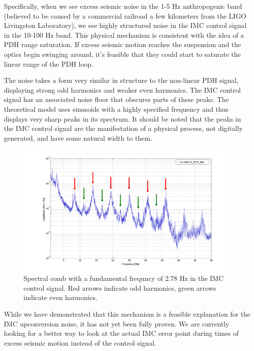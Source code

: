 Specifically, when we see excess seismic noise in the 1-5 Hz anthropogenic band (believed to be caused by a commercial railroad a few kilometers from the LIGO Livingston Laboratory), we see highly structured noise in the IMC control signal in the 10-100 Hz band. This physical mechanism is consistent with the idea of a PDH range saturation. If excess seismic motion reaches the suspension and the optics begin swinging around, it's feasible that they could start to saturate the linear range of the PDH loop.

The noise takes a form very similar in structure to the non-linear PDH signal, displaying strong odd harmonics and weaker even harmonics. The IMC control signal has an associated noise floor that obscures parts of these peaks. The theoretical model uses sinusoids with a highly specified frequency and thus displays very sharp peaks in its spectrum. It should be noted that the peaks in the IMC control signal are the manifestation of a physical process, not digitally generated, and have some natural width to them.

\begin{figure}[h!]
\caption[Spectral comb in IMC control signal]{Spectral comb with a fundamental frequncy of 2.78 Hz in the IMC control signal. Red arrows indicate odd harmonics, green arrows indicate even harmonics. }
\includegraphics[height=0.6\textwidth]{figures/IMCUpconversion/upconversion_comb.png}
\end{figure}

While we have demonstrated that this mechanism is a feasible explanation for the IMC upconversion noise, it has not yet been fully proven. We are currently looking for a better way to look at the actual IMC error point during times of excess seismic motion instead of the control signal. 

